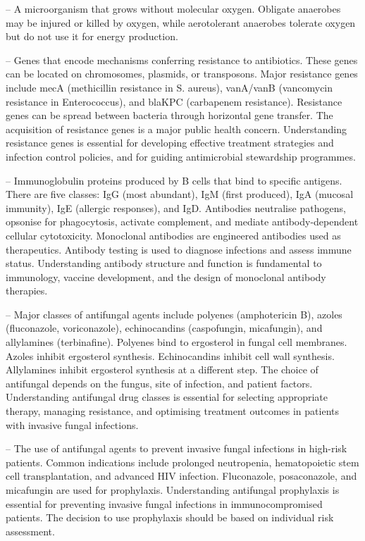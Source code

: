 -- A microorganism that grows without molecular oxygen. Obligate anaerobes may be injured or killed by oxygen, while aerotolerant anaerobes tolerate oxygen but do not use it for energy production.

-- Genes that encode mechanisms conferring resistance to antibiotics. These genes can be located on chromosomes, plasmids, or transposons. Major resistance genes include mecA (methicillin resistance in S. aureus), vanA/vanB (vancomycin resistance in Enterococcus), and blaKPC (carbapenem resistance). Resistance genes can be spread between bacteria through horizontal gene transfer. The acquisition of resistance genes is a major public health concern. Understanding resistance genes is essential for developing effective treatment strategies and infection control policies, and for guiding antimicrobial stewardship programmes.

-- Immunoglobulin proteins produced by B cells that bind to specific antigens. There are five classes: IgG (most abundant), IgM (first produced), IgA (mucosal immunity), IgE (allergic responses), and IgD. Antibodies neutralise pathogens, opsonise for phagocytosis, activate complement, and mediate antibody-dependent cellular cytotoxicity. Monoclonal antibodies are engineered antibodies used as therapeutics. Antibody testing is used to diagnose infections and assess immune status. Understanding antibody structure and function is fundamental to immunology, vaccine development, and the design of monoclonal antibody therapies.

-- Major classes of antifungal agents include polyenes (amphotericin B), azoles (fluconazole, voriconazole), echinocandins (caspofungin, micafungin), and allylamines (terbinafine). Polyenes bind to ergosterol in fungal cell membranes. Azoles inhibit ergosterol synthesis. Echinocandins inhibit cell wall synthesis. Allylamines inhibit ergosterol synthesis at a different step. The choice of antifungal depends on the fungus, site of infection, and patient factors. Understanding antifungal drug classes is essential for selecting appropriate therapy, managing resistance, and optimising treatment outcomes in patients with invasive fungal infections.

-- The use of antifungal agents to prevent invasive fungal infections in high-risk patients. Common indications include prolonged neutropenia, hematopoietic stem cell transplantation, and advanced HIV infection. Fluconazole, posaconazole, and micafungin are used for prophylaxis. Understanding antifungal prophylaxis is essential for preventing invasive fungal infections in immunocompromised patients. The decision to use prophylaxis should be based on individual risk assessment.

